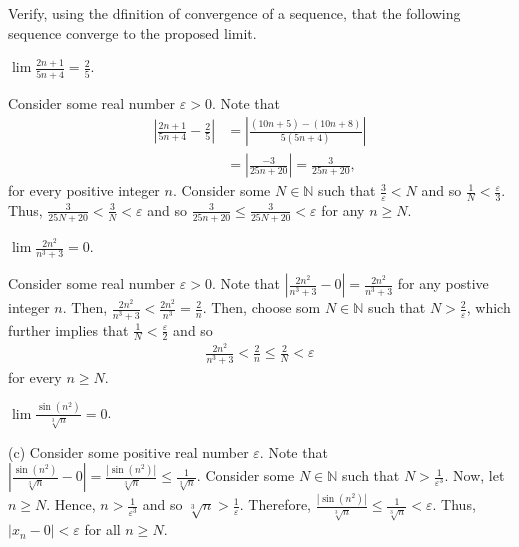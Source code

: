 \documentclass[12pt]{article}
\newcommand{\N}{\mathbb{N}}
\newcommand{\Abs}[1]{\left\vert #1 \right\vert}
\newenvironment{problem}[2][Problem]{\begin{trivlist} \item[\hskip \labelsep {\bfseries #1}\hskip \labelsep {\bfseries #2.}]}{\end{trivlist}}
\newenvironment{solution}[1][Solution]{\begin{trivlist} \item[\hskip \labelsep {\bfseries #1}]}{\end{trivlist}}
\begin{document}
    \begin{problem}{2.2.2}
      Verify, using the dfinition of convergence of a sequence, that the following sequence converge to the proposed limit.
      \begin{enumerate}[label=(\alph*)]
	\item $\lim \frac{2n+1}{5n+4}=\frac{2}{5}$.
    \begin{solution}
     Consider some real number $\varepsilon>0$. Note that
    \begin{align*}
      \left\vert\frac{2n+1}{5n+4}-\frac{2}{5}\right\vert &= \left\vert\frac{(10n+5)-(10n+8)}{5(5n+4)}\right\vert\\
      &= \left\vert\frac{-3}{25n+20}\right\vert = \frac{3}{25n+20},
    \end{align*}
    for every positive integer $n$. Consider some $N\in \N$ such that $\frac{3}{\varepsilon}<N$ and so $\frac{1}{N} < \frac{\varepsilon}{3}$. Thus, $\frac{3}{25N+20}<\frac{3}{N} <\varepsilon$ and so $\frac{3}{25n+20}\leq \frac{3}{25N+20} <\varepsilon$ for any $n\geq N$.
    \end{solution}
	\item $\lim \frac{2n^{2}}{n^{3}+3}=0$.
    \begin{solution}
      Consider some real number $\varepsilon>0$. Note that $\Abs{\frac{2n^{2}}{n^{3}+3} - 0} = \frac{2n^{2}}{n^{3}+3}$ for any postive integer $n$. Then, $\frac{2n^{2}}{n^{3}+3} < \frac{2n^{2}}{n^{3}} = \frac{2}{n}$. Then, choose som $N\in \N$ such that $N>\frac{2}{\varepsilon}$, which further implies that $\frac{1}{N}<\frac{\varepsilon}{2}$ and so 
    \begin{align*}
      \frac{2n^{2}}{n^{3}+3} < \frac{2}{n}\leq \frac{2}{N}<\varepsilon
    \end{align*}
    for every $n\geq N$.
    \end{solution}
	\item $\lim \frac{\sin(n^{2})}{\sqrt[3]{n}}=0$.
	  \begin{solution}{(c)}
	    Consider some positive real number $\varepsilon$. Note that $\Abs{\frac{\sin(n^{2})}{\sqrt[3]{n}}-0} = \frac{\Abs{\sin(n^{2})}}{\sqrt[3]{n}}\leq \frac{1}{\sqrt[3]{n}}$. Consider some $N\in \N$ such that $N>\frac{1}{\varepsilon^{3}}$. Now, let $n\geq N$. Hence, $n>\frac{1}{\varepsilon^{3}}$ and so $\sqrt[3]{n}>\frac{1}{\varepsilon}$. Therefore, $\frac{\Abs{\sin(n^{2})}}{\sqrt[3]{n}}\leq \frac{1}{\sqrt[3]{n}}< \varepsilon$. Thus, $|x_{n}-0|<\varepsilon$ for all $n\geq N$.
    \end{solution}
    \end{enumerate}
    \end{problem}
       
\end{document}
